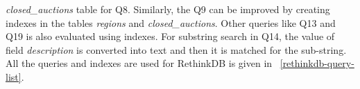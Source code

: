 \textit{closed\_auctions} table for Q8. Similarly, the Q9 can be improved by creating indexes in the tables \textit{regions} and \textit{closed\_auctions}. Other queries like Q13 and Q19 is also evaluated using indexes. For substring search in Q14, the value of  field \textit{description} is converted into text and then it is matched for the sub-string. All the queries and indexes are used for RethinkDB is given in ~\ref{rethinkdb-query-list}.
